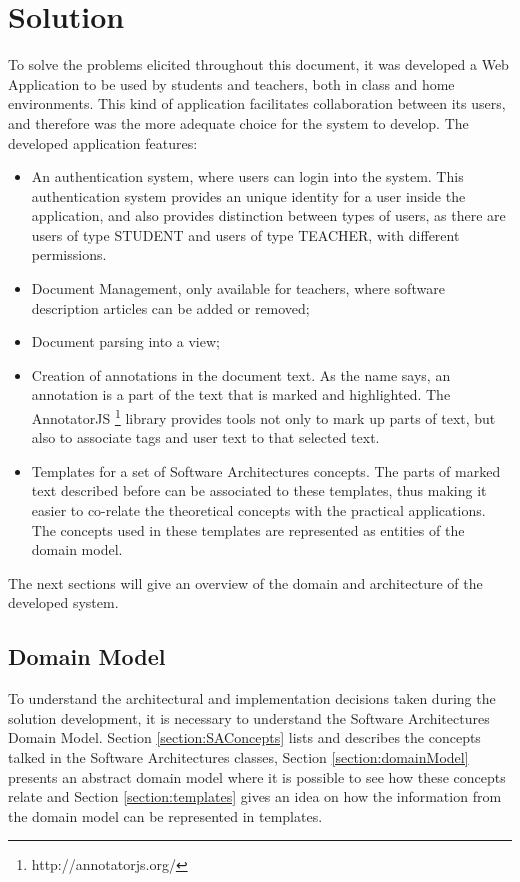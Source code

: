 
\chapter{Solution}
\label{chapter:solution}
To solve the problems elicited throughout this document, it was developed a Web Application to be used by students and teachers, both in class and home environments. This kind of application facilitates collaboration between its users, and therefore was the more adequate choice for the system to develop. The developed application features:
\begin{itemize}
\item An authentication system, where users can login into the system. This authentication system provides an unique identity for a user inside the application, and also provides distinction between types of users, as there are users of type STUDENT and users of type TEACHER, with different permissions.
\item Document Management, only available for teachers, where software description articles can be added or removed;
\item Document parsing into a view;
\item Creation of annotations in the document text. As the name says, an annotation is a part of the text that is marked and highlighted. The AnnotatorJS \footnote{http://annotatorjs.org/} library provides tools not only to mark up parts of text, but also to associate tags and user text to that selected text. 
\item Templates for a set of Software Architectures concepts. The parts of marked text described before can be associated to these templates, thus making it easier to co-relate the theoretical concepts with the practical applications. The concepts used in these templates are represented as entities of the domain model.

\end{itemize}

The next sections will give an overview of the domain and architecture of the developed system.

\section{Domain Model}
\label{chapter:domainModel}
To understand the architectural and implementation decisions taken during the solution development, it is necessary to understand the Software Architectures Domain Model. Section \ref{section:SAConcepts} lists and describes the concepts talked in the Software Architectures classes, Section \ref{section:domainModel} presents an abstract domain model where it is possible to see how these concepts relate and Section \ref{section:templates} gives an idea on how the information from the domain model can be represented in templates.

